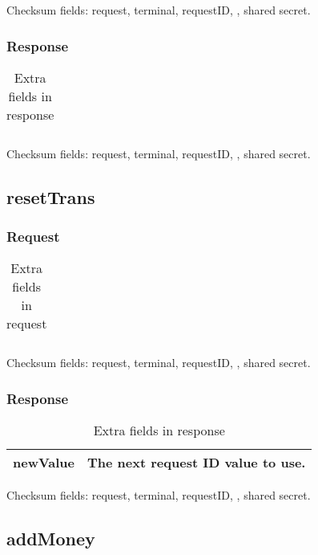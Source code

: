 \documentclass[a4paper,11pt]{article}
\newcommand{\code}[1]
   {\textsf{#1}}
\begin{document}
Checksum fields: request, terminal, requestID, , shared secret.

\subsubsection{Response}
\begin{table}[!h]
  \begin{tabular}{|l|l|}
    \hline
       \\\hline
  \end{tabular} 
  \caption{Extra fields in \code{} response}
\end{table}

Checksum fields: request, terminal, requestID, , shared secret.


\subsection{resetTrans}

\subsubsection{Request}
\begin{table}[!h]
  \begin{tabular}{|l|l|}
    \hline
       \\\hline
  \end{tabular} 
  \caption{Extra fields in \code{} request}
\end{table}

Checksum fields: request, terminal, requestID, , shared secret.

\subsubsection{Response}
\begin{table}[!h]
  \begin{tabular}{|l|l|}
    \hline
     newValue & The next request ID value to use.  \\\hline
  \end{tabular} 
  \caption{Extra fields in \code{} response}
\end{table}

Checksum fields: request, terminal, requestID, , shared secret.


\subsection{addMoney}
\end{document}

